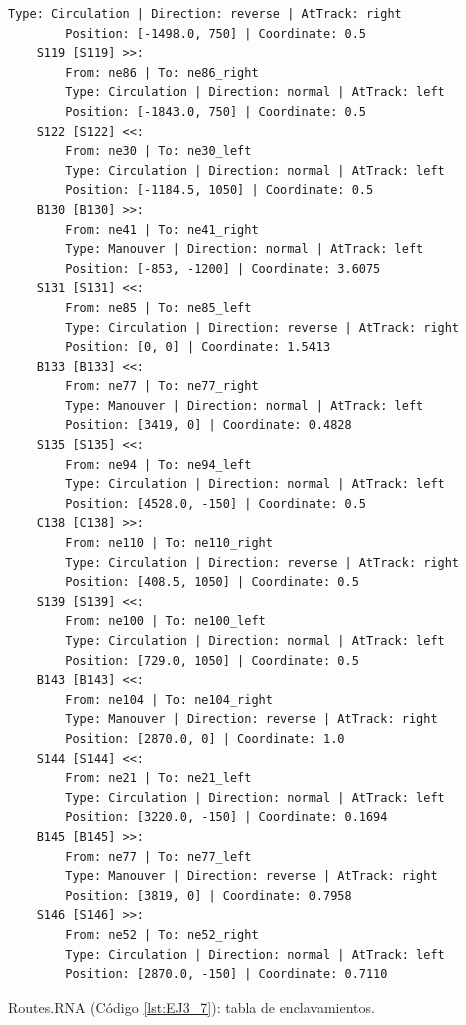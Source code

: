 \begin{lstlisting}[language = {}, tabsize=4, basicstyle=\footnotesize\ttfamily, showspaces=false, showstringspaces=false, caption = Signalling.RNA, label = {lst:EJ3_6}]
		Type: Circulation | Direction: reverse | AtTrack: right 
		Position: [-1498.0, 750] | Coordinate: 0.5
	S119 [S119] >>:
		From: ne86 | To: ne86_right
		Type: Circulation | Direction: normal | AtTrack: left 
		Position: [-1843.0, 750] | Coordinate: 0.5
	S122 [S122] <<:
		From: ne30 | To: ne30_left
		Type: Circulation | Direction: normal | AtTrack: left 
		Position: [-1184.5, 1050] | Coordinate: 0.5
	B130 [B130] >>:
		From: ne41 | To: ne41_right
		Type: Manouver | Direction: normal | AtTrack: left 
		Position: [-853, -1200] | Coordinate: 3.6075
	S131 [S131] <<:
		From: ne85 | To: ne85_left
		Type: Circulation | Direction: reverse | AtTrack: right 
		Position: [0, 0] | Coordinate: 1.5413
	B133 [B133] <<:
		From: ne77 | To: ne77_right
		Type: Manouver | Direction: normal | AtTrack: left 
		Position: [3419, 0] | Coordinate: 0.4828
	S135 [S135] <<:
		From: ne94 | To: ne94_left
		Type: Circulation | Direction: normal | AtTrack: left 
		Position: [4528.0, -150] | Coordinate: 0.5
	C138 [C138] >>:
		From: ne110 | To: ne110_right
		Type: Circulation | Direction: reverse | AtTrack: right 
		Position: [408.5, 1050] | Coordinate: 0.5
	S139 [S139] <<:
		From: ne100 | To: ne100_left
		Type: Circulation | Direction: normal | AtTrack: left 
		Position: [729.0, 1050] | Coordinate: 0.5
	B143 [B143] <<:
		From: ne104 | To: ne104_right
		Type: Manouver | Direction: reverse | AtTrack: right 
		Position: [2870.0, 0] | Coordinate: 1.0
	S144 [S144] <<:
		From: ne21 | To: ne21_left
		Type: Circulation | Direction: normal | AtTrack: left 
		Position: [3220.0, -150] | Coordinate: 0.1694
	B145 [B145] >>:
		From: ne77 | To: ne77_left
		Type: Manouver | Direction: reverse | AtTrack: right 
		Position: [3819, 0] | Coordinate: 0.7958
	S146 [S146] >>:
		From: ne52 | To: ne52_right
		Type: Circulation | Direction: normal | AtTrack: left 
		Position: [2870.0, -150] | Coordinate: 0.7110
	\end{lstlisting}
	
	Routes.RNA (Código \ref{lst:EJ3_7}): tabla de enclavamientos.
	
